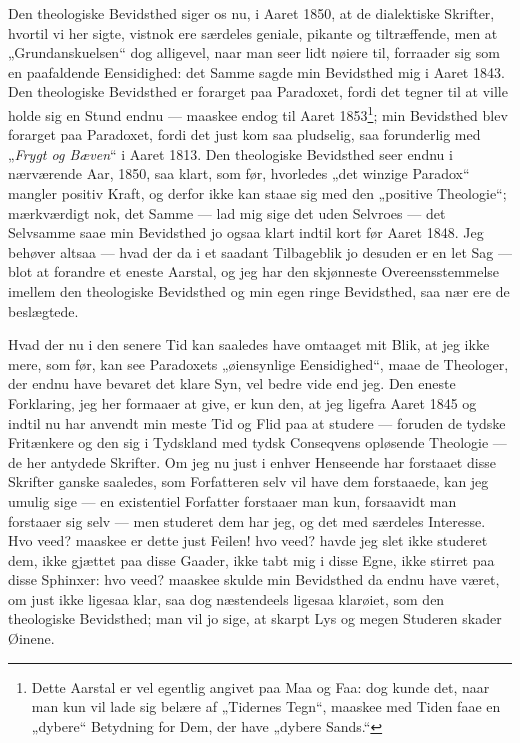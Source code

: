 \documentclass[12pt,a4paper]{book}
\newcommand{\opage}[1]{\marginnote{\footnotesize\textit{[#1]}}}
\begin{document}
Den theologiske Bevidsthed siger os nu, i Aaret 1850, at de dialektiske
Skrifter, hvortil vi her sigte, vistnok ere særdeles geniale, pikante og
tiltræffende, men at „Grundanskuelsen“ dog alligevel, naar man seer lidt nøiere
til, forraader sig som en paafaldende Eensidighed: det Samme sagde min
Bevidsthed mig i Aaret 1843. Den theologiske Bevidsthed er forarget paa
Paradoxet, fordi det tegner til at ville holde sig en Stund endnu
\opage{126} --- maaskee endog til Aaret 1853\footnote{Dette Aarstal er vel egentlig angivet
paa Maa og Faa: dog kunde det, naar man kun vil lade sig belære af „Tidernes
Tegn“, maaskee med Tiden faae en „dybere“ Betydning for Dem, der have „dybere
Sands.“}; min Bevidsthed blev forarget paa Paradoxet, fordi det just kom saa
pludselig, saa forunderlig med „\emph{Frygt og Bæven}“ i Aaret 1813.
Den theologiske Bevidsthed seer endnu i nærværende Aar, 1850, saa klart, som
før, hvorledes „det winzige Paradox“ mangler positiv Kraft, og derfor ikke kan
staae sig med den „positive Theologie“; mærkværdigt nok, det Samme --- lad mig
sige det uden Selvroes --- det Selvsamme saae min Bevidsthed jo ogsaa klart
indtil kort før Aaret 1848. Jeg behøver altsaa --- hvad der da i et saadant
Tilbageblik jo desuden er en let Sag --- blot at forandre et eneste Aarstal, og
jeg har den skjønneste Overeensstemmelse imellem den theologiske Bevidsthed og
min egen ringe Bevidsthed, saa nær ere de beslægtede.

Hvad der nu i den senere Tid kan saaledes have omtaaget mit Blik, at jeg ikke
mere, som før, kan see Paradoxets „øiensynlige Eensidighed“, maae de Theologer,
der endnu have bevaret det klare Syn, vel bedre vide end jeg. Den eneste
Forklaring, jeg her formaaer at give, er kun den, at jeg ligefra Aaret 1845 og
indtil nu har anvendt min meste Tid og Flid paa at studere --- foruden de
tydske Fritænkere og den sig i Tydskland med tydsk Conseqvens opløsende
Theologie --- de her antydede Skrifter. Om jeg nu just i enhver Henseende har
forstaaet disse Skrifter ganske saaledes, som Forfatteren selv vil have dem
forstaaede, kan jeg umulig sige --- en existentiel Forfatter forstaaer man kun,
forsaavidt man forstaaer sig selv --- men studeret dem har jeg, og det med
særdeles Interesse. Hvo veed? maaskee er dette just Feilen! hvo veed? havde jeg
slet ikke studeret dem, ikke gjættet paa disse Gaader, ikke tabt mig i disse
Egne, ikke stirret
\opage{127} paa disse Sphinxer: hvo veed? maaskee skulde min Bevidsthed da endnu have
været, om just ikke ligesaa klar, saa dog næstendeels ligesaa klarøiet, som den
theologiske Bevidsthed; man vil jo sige, at skarpt Lys og megen Studeren skader
Øinene.
\end{document}
